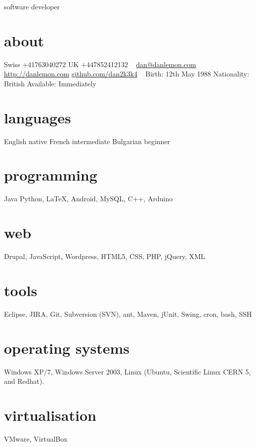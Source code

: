 \documentclass[]{friggeri-cv}
\begin{document}
       {software developer}


\begin{aside}
  \section{about}
    Swiss +41763040272
    UK +447852412132
    ~
    \href{mailto:dan@danlemon.com}{dan@danlemon.com}
    \href{http://danlemon.com}{http://danlemon.com}
    \href{http://github.com/dan2k3k4}{github.com/dan2k3k4}
    ~
    Birth: 12th May 1988
    Nationality: British
    Available: Immediately
  \section{languages}
    English native
    French intermediate
    Bulgarian beginner
  \section{programming}
  Java
    Python, \LaTeX, Android, MySQL, C++, Arduino
  \section{web}
    Drupal, JavaScript, Wordpress, HTML5, CSS, PHP, jQuery, XML
  \section{tools}
    Eclipse, JIRA, Git, Subversion (SVN), ant, Maven, jUnit, Swing, cron, bash, SSH
  \section{operating systems}
    Windows XP/7, Windows Server 2003, Linux (Ubuntu, Scientific Linux CERN 5, and Redhat).
  \section{virtualisation}
    VMware, VirtualBox
\end{aside}


\end{document}
